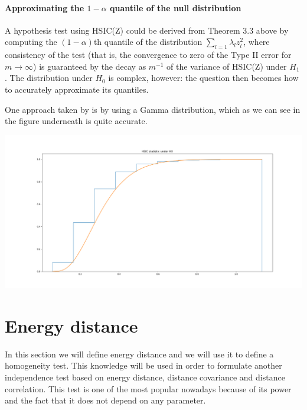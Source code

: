 \documentclass[8pt,a4paper]{article}
\theoremstyle{plain}
\theoremstyle{definition}
\theoremstyle{remark}
\begin{document}
\paragraph*{Approximating the $1-\alpha$ quantile of the null distribution}

A hypothesis test using HSIC(Z)
could be derived from Theorem 3.3 above by computing the $(1 − \alpha)$th quantile of the distribution  $\sum_{l=1} \lambda_{l}z_{l}^{2}$,
where consistency of the test (that is, the convergence to zero of the Type II error for $m \rightarrow \infty$) is
guaranteed by the decay as $m^{-1}$ of the variance of HSIC(Z) under $H_{1}$ . The distribution under $H_{0}$
is complex, however: the question then becomes how to accurately approximate its quantiles.

One approach taken by \cite{HSICdistribution} is by using a Gamma distribution, which as we can see in the figure underneath is quite accurate.

\includegraphics[scale=0.28]{HSIC_DistributionGamma.png}

\section{Energy distance}

In this section we will define energy distance and we will use it to define a homogeneity test.
This knowledge will be used in order to formulate another independence test based on energy distance, distance covariance and distance correlation. This test is one of the most popular nowadays because of its power and the fact that it does not depend on any parameter.
\end{document}
